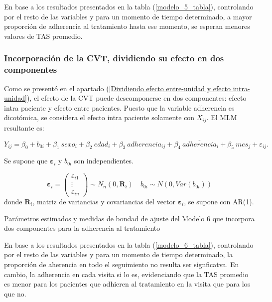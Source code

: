 \documentclass[spanish]{article}
\numberwithin{figure}{subsection}
\numberwithin{equation}{subsection}
\numberwithin{table}{subsection}
\begin{document}
En base a los resultados presentados en la tabla (\ref{modelo_5_tabla}),
controlando por el resto de las variables y para un momento de tiempo
determinado, a mayor proporción de adherencia al tratamiento hasta ese momento,
se esperan menores valores de TAS promedio.

\subsubsection{Incorporación de la CVT, dividiendo su efecto en dos componentes}

Como se presentó en el apartado (\ref{Dividiendo efecto entre-unidad y efecto
intra-unidad}), el efecto de la CVT puede descomponerse en dos componentes:
efecto intra paciente y efecto entre pacientes. Puesto que la variable
adherencia es dicotómica, se considera el efecto intra paciente solamente con
$X_{ij}$. El MLM resultante es:

\begin{equation}
	\label{modelo_6}
	Y_{ij} = \beta_0 + b_{0i} + \beta_1\ sexo_i + \beta_2\ edad_i + \beta_3\ adherencia_{ij}
	+ \beta_4\ \overline{adherencia}_i + \beta_5\ mes_j + \varepsilon_{ij}.
\end{equation}

Se supone que $\bm{\varepsilon}_i$ y $b_{0i}$ son independientes.

\[ 
	\bm{\varepsilon}_i = \begin{pmatrix} \varepsilon_{i1} \\ \vdots \\ \varepsilon_{in} \end{pmatrix} \sim N_{n}(0, \bm{R}_i)
	\quad
	b_{0i} \sim N(0, Var(b_{0i}))
\]
donde $\bm{R}_i$, matriz de variancias y covariancias del vector
$\bm{\varepsilon}_{i}$, se supone con AR(1).

\begin{table}[H]
	\centering
	\caption{Parámetros estimados y medidas de bondad de ajuste del Modelo 6 que incorpora dos componentes para la adherencia al tratamiento}
	\label{modelo_6_tabla}
	
\end{table}

En base a los resultados presentados en la tabla (\ref{modelo_6_tabla}),
controlando por el resto de las variables y para un momento de tiempo
determinado, la proporción de aherencia en todo el seguimiento no resulta ser
signficatva. En cambio, la adherencia en cada visita si lo es, evidenciando que
la TAS promedio es menor para los pacientes que adhieren al tratamiento en la
visita que para los que no.
\end{document}
